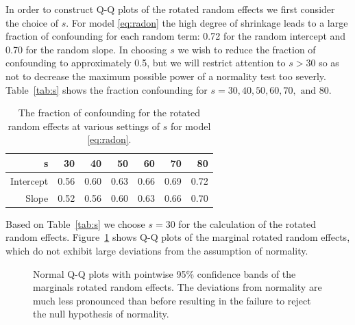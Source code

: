 \documentclass[12pt]{article} %
\begin{document}
In order to construct Q-Q plots of the rotated random effects we first consider the choice of $s$. For model \eqref{eq:radon} the high degree of shrinkage leads to a large fraction of confounding for each random term: 0.72 for the random intercept and 0.70 for the random slope. In choosing $s$ we wish to reduce the fraction of confounding to approximately 0.5, but we will restrict attention to $s > 30$ so as not to decrease the maximum possible power of a normality test too severly. Table~\eqref{tab:s} shows the fraction confounding for $s = 30, 40, 50, 60, 70, \text{ and } 80$. 
%
\begin{table}[ht]
\centering
\caption{\label{tab:s} The fraction of confounding for the rotated random effects at various settings of $s$ for model \eqref{eq:radon}.}
\begin{tabular}{rrrrrrr}
  \hline
  s         & 30 & 40 & 50 & 60 & 70 & 80 \\ \hline
  Intercept & 0.56 & 0.60 & 0.63 & 0.66 & 0.69 & 0.72 \\ 
  Slope     & 0.52 & 0.56 & 0.60 & 0.63 & 0.66 & 0.70 \\ 
   \hline
\end{tabular}
\end{table}
%
Based on  Table~\eqref{tab:s} we choose $s=30$ for the calculation of the rotated random effects. Figure~\ref{fig:rotate-radon} shows Q-Q plots of the marginal rotated random effects, which do not exhibit large deviations from the assumption of normality.



\begin{figure}[htb]
	\centering
	\caption{\label{fig:rotate-radon} Normal Q-Q plots with pointwise 95\% confidence bands of the marginals rotated random effects. The deviations from normality are much less pronounced than before resulting in the failure to reject the null hypothesis of normality.}
\end{figure}
\end{document}
